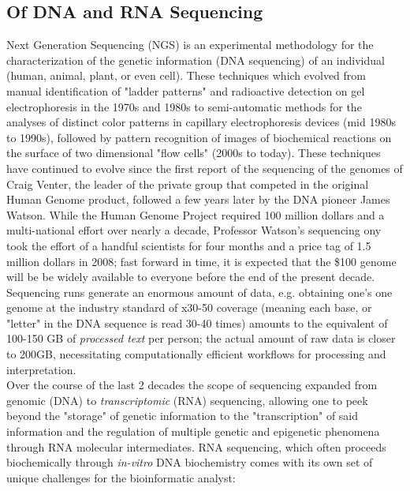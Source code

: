 \documentclass[10pt]{article}
\begin{document}
\subsection{Of DNA and RNA Sequencing}\label{sec:RNADNAsequencing} 
Next Generation Sequencing (NGS) is an experimental methodology for the characterization of the genetic information (DNA sequencing) of an individual (human, animal, plant, or even cell). These techniques which evolved\cite{genomics_brief_2021} from manual identification of "ladder patterns" and radioactive detection on gel electrophoresis in the 1970s and 1980s to semi-automatic methods for the analyses of distinct color patterns in capillary electrophoresis devices (mid 1980s to 1990s), followed by pattern recognition of images of biochemical reactions on the surface of two dimensional "flow cells" (2000s to today). These techniques have continued to evolve since the first report of the sequencing of the genomes of Craig Venter, the leader of the private group that competed in the original Human Genome product, followed a few years later by the DNA pioneer James Watson\cite{wadman_james_2008}. While the Human Genome Project required 100 million dollars and a multi-national effort over nearly a decade, Professor Watson's sequencing ony took the effort of a handful scientists for four months and a price tag of 1.5 million dollars in 2008; fast forward in time, it is expected that the \$100 genome will be be widely available to everyone before the end of the present decade. Sequencing runs generate an enormous amount of data, e.g. obtaining one's one genome at the industry standard of x30-50 coverage (meaning each base, or "letter" in the DNA sequence is read 30-40 times) amounts to the equivalent of 100-150 GB of \textit{processed text} per person; the actual amount of raw data is closer to 200GB, necessitating computationally efficient workflows for processing and interpretation.
\\
Over the course of the last 2 decades the scope of sequencing expanded from genomic (DNA) to \textit{transcriptomic} (RNA) sequencing, allowing one to peek beyond the "storage" of genetic information to  the "transcription" of said information and the regulation of multiple genetic and epigenetic phenomena through RNA molecular intermediates. RNA sequencing, which often proceeds biochemically through \textit{in-vitro} DNA biochemistry comes with its own set of unique challenges for the bioinformatic analyst:
\end{document}
